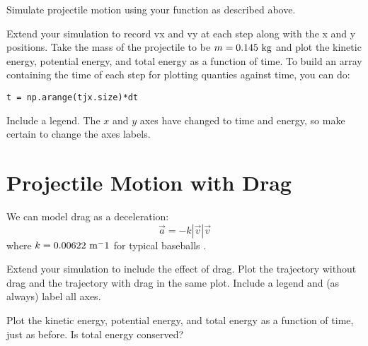 \plot Simulate projectile motion using your function  as described above.

\plot Extend your simulation to record vx and vy at each step along with the x and y positions.  Take the mass of the projectile to be $m=0.145~\rm kg$ and plot the kinetic energy, potential energy, and total energy as a function of time.  To build an array containing the time of each step 
for plotting quanties against time, you can do:
\begin{verbatim}
t = np.arange(tjx.size)*dt
\end{verbatim}
Include a legend. The $x$ and $y$ axes have changed to time and energy, so make certain to change the axes labels.


\section{Projectile Motion with Drag}

We can model drag as a deceleration:
\begin{displaymath}
\vec{a} = -k |\vec{v}| \vec{v}
\end{displaymath}
where $k=0.00622~\rm m^-1$ for typical baseballs .

\plot Extend your simulation to include the effect of drag.  Plot the trajectory without drag and the trajectory with drag in the same plot.  Include a legend and (as always) label all axes.

\plot Plot the kinetic energy, potential energy, and total energy as a function	of time, just as before.  Is total energy conserved?


